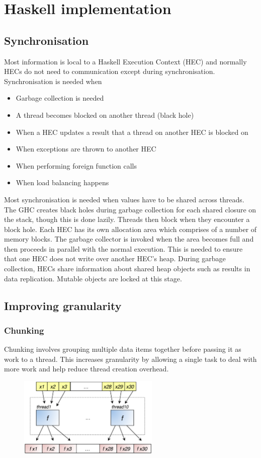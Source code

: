 \documentclass[CS4204-Notes.tex]{subfiles}
\begin{document}
\section{Haskell implementation}

\subsection{Synchronisation}
Most information is local to a Haskell Execution Context (HEC) and normally HECs do not need to communication except during synchronisation. Synchronisation is needed when
\begin{itemize}
\item Garbage collection is needed
\item A thread becomes blocked on another thread (black hole)
\item When a HEC updates a result that a thread on another HEC is blocked on
\item When exceptions are thrown to another HEC
\item When performing foreign function calls
\item When load balancing happens
\end{itemize}
Most synchronisation is needed when values have to be shared across threads. The GHC creates black holes during garbage collection for each shared closure on the stack, though this is done lazily. Threads then block when they encounter a block hole.\n
Each HEC has its own allocation area which comprises of a number of memory blocks. The garbage collector is invoked when the area becomes full and then proceeds in parallel with the normal execution. This is needed to ensure that one HEC does not write over another HEC's heap. During garbage collection, HECs share information about shared heap objects such as results in data replication. Mutable objects are locked at this stage.

\subsection{Improving granularity}

\subsubsection{Chunking}
Chunking involves grouping multiple data items together before passing it as work to a thread. This increases granularity by allowing a single task to deal with more work and help reduce thread creation overhead.
\begin{figure}[H]
  \centering
  \includegraphics[width=0.6\textwidth, keepaspectratio]{imgs/chunking.png}
\end{figure}
\end{document}
